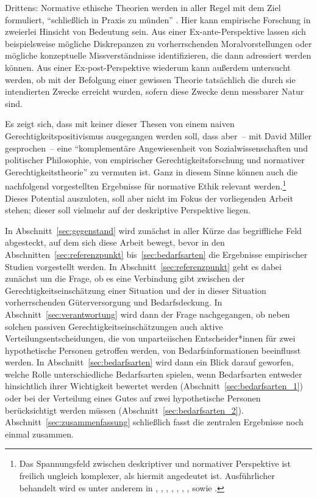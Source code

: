 \documentclass[justified,nobib,symmetric,twoside]{tufte-handout}
\begin{document}
Drittens: Normative ethische Theorien werden in aller Regel mit dem Ziel formuliert, \enquote{schließlich in Praxis zu münden} \citep[S.~22]{bauer_zwei_2019}.
Hier kann empirische Forschung in zweierlei Hinsicht von Bedeutung sein.
Aus einer Ex-ante-Perspektive lassen sich beispielsweise mögliche Diskrepanzen zu vorherrschenden Moralvorstellungen oder mögliche konzeptuelle Missverständnisse identifizieren, die dann adressiert werden können.
Aus einer Ex-post-Perspektive wiederum kann außerdem untersucht werden, ob mit der Befolgung einer gewissen Theorie tatsächlich die durch sie intendierten Zwecke erreicht wurden, sofern diese Zwecke denn messbarer Natur sind.

Es zeigt sich, dass mit keiner dieser Thesen von einem naiven Gerechtigkeitspositivismus ausgegangen werden soll, dass aber~-- mit David Miller gesprochen~-- eine \enquote{komplementäre Angewiesenheit von Sozialwissenschaften und politischer Philosophie, von empirischer Gerechtigkeitsforschung und normativer Gerechtigkeitstheorie} \citep[S.~10]{honneth_philosophie_2008} zu vermuten ist.
Ganz in diesem Sinne können auch die nachfolgend vorgestellten Ergebnisse für normative Ethik relevant werden.\footnote{Das Spannungsfeld zwischen deskriptiver und normativer Perspektive ist freilich ungleich komplexer, als hiermit angedeutet ist. Ausführlicher behandelt wird es unter anderem in \citet{appiah_experiments_2009}, \citet{bauer_philosophie_2019,bauer_empirical_2020}, \citet{christen_empirically_2014}, \citet{eckensberger_ethische_1993}, \citet{karageorgoudis_sein_2021}, \citet{luetge_experimental_2014}, \citet{marchetti_facts_2017}, \citet{paulo_empirische_2020} sowie \citet{poelzler_moral_2018}.}
Dieses Potential auszuloten, soll aber nicht im Fokus der vorliegenden Arbeit stehen; dieser soll vielmehr auf der deskriptive Perspektive liegen.

In Abschnitt~\ref{sec:gegenstand} wird zunächst in aller Kürze das begriffliche Feld abgesteckt, auf dem sich diese Arbeit bewegt, bevor in den Abschnitten~\ref{sec:referenzpunkt} bis~\ref{sec:bedarfsarten} die Ergebnisse empirischer Studien vorgestellt werden.
In Abschnitt~\ref{sec:referenzpunkt} geht es dabei zunächst um die Frage, ob es eine Verbindung gibt zwischen der Gerechtigkeitseinschätzung einer Situation und der in dieser Situation vorherrschenden Güterversorgung und Bedarfsdeckung.
In Abschnitt~\ref{sec:verantwortung} wird dann der Frage nachgegangen, ob neben solchen passiven Gerechtigkeitseinschätzungen auch aktive Verteilungsentscheidungen, die von unparteiischen Entscheider*innen für zwei hypothetische Personen getroffen werden, von Bedarfsinformationen beeinflusst werden.
In Abschnitt~\ref{sec:bedarfsarten} wird dann ein Blick darauf geworfen, welche Rolle unterschiedliche Bedarfsarten spielen, wenn Bedarfsarten entweder hinsichtlich ihrer Wichtigkeit bewertet werden (Abschnitt~\ref{sec:bedarfsarten_1}) oder bei der Verteilung eines Gutes auf zwei hypothetische Personen berücksichtigt werden müssen (Abschnitt~\ref{sec:bedarfsarten_2}).
Abschnitt~\ref{sec:zusammenfassung} schließlich fasst die zentralen Ergebnisse noch einmal zusammen.
\end{document}
